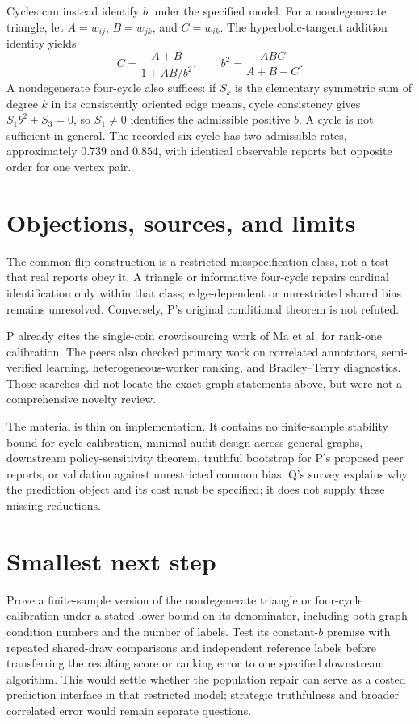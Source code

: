 \documentclass{article}
\begin{document}
Cycles can instead identify \(b\) under the specified model. For a nondegenerate triangle, let \(A=w_{ij}\), \(B=w_{jk}\), and \(C=w_{ik}\). The hyperbolic-tangent addition identity yields
\[
C=\frac{A+B}{1+AB/b^2},
\qquad
b^2=\frac{ABC}{A+B-C}.
\]
A nondegenerate four-cycle also suffices: if \(S_k\) is the elementary symmetric sum of degree \(k\) in its consistently oriented edge means, cycle consistency gives \(S_1b^2+S_3=0\), so \(S_1\neq0\) identifies the admissible positive \(b\). A cycle is not sufficient in general. The recorded six-cycle has two admissible rates, approximately \(0.739\) and \(0.854\), with identical observable reports but opposite order for one vertex pair. 

\section{Objections, sources, and limits}

The common-flip construction is a restricted misspecification class, not a test that real reports obey it. A triangle or informative four-cycle repairs cardinal identification only within that class; edge-dependent or unrestricted shared bias remains unresolved. Conversely, P's original conditional theorem is not refuted. 

P already cites the single-coin crowdsourcing work of Ma et al. for rank-one calibration. The peers also checked primary work on correlated annotators, semi-verified learning, heterogeneous-worker ranking, and Bradley--Terry diagnostics. Those searches did not locate the exact graph statements above, but were not a comprehensive novelty review. 

The material is thin on implementation. It contains no finite-sample stability bound for cycle calibration, minimal audit design across general graphs, downstream policy-sensitivity theorem, truthful bootstrap for P's proposed peer reports, or validation against unrestricted common bias. Q's survey explains why the prediction object and its cost must be specified; it does not supply these missing reductions. 

\section{Smallest next step}

Prove a finite-sample version of the nondegenerate triangle or four-cycle calibration under a stated lower bound on its denominator, including both graph condition numbers and the number of labels. Test its constant-\(b\) premise with repeated shared-draw comparisons and independent reference labels before transferring the resulting score or ranking error to one specified downstream algorithm. This would settle whether the population repair can serve as a costed prediction interface in that restricted model; strategic truthfulness and broader correlated error would remain separate questions. 
\end{document}
